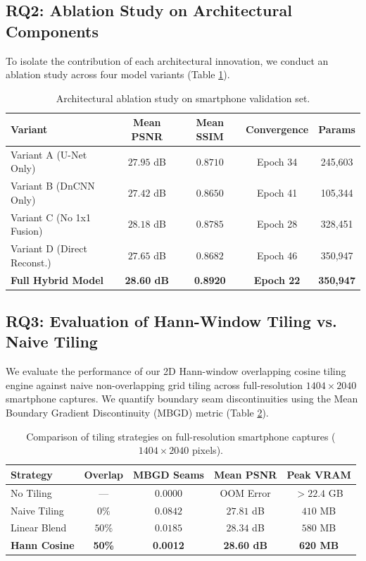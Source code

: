 \documentclass{ieeeaccess}
\begin{document}
\subsection{RQ2: Ablation Study on Architectural Components}
To isolate the contribution of each architectural innovation, we conduct an ablation study across four model variants (Table \ref{tab:ablation}).

\begin{table}[htbp]
\centering
\caption{Architectural ablation study on smartphone validation set.}
\label{tab:ablation}
\begin{tabular}{lcccc}
\toprule
Variant & Mean PSNR & Mean SSIM & Convergence & Params \\
\midrule
Variant A (U-Net Only) & $27.95$ dB & $0.8710$ & Epoch 34 & 245,603 \\
Variant B (DnCNN Only) & $27.42$ dB & $0.8650$ & Epoch 41 & 105,344 \\
Variant C (No 1x1 Fusion) & $28.18$ dB & $0.8785$ & Epoch 28 & 328,451 \\
Variant D (Direct Reconst.) & $27.65$ dB & $0.8682$ & Epoch 46 & 350,947 \\
\textbf{Full Hybrid Model} & \textbf{28.60 dB} & \textbf{0.8920} & \textbf{Epoch 22} & \textbf{350,947} \\
\bottomrule
\end{tabular}
\end{table}

\subsection{RQ3: Evaluation of Hann-Window Tiling vs. Naive Tiling}
We evaluate the performance of our 2D Hann-window overlapping cosine tiling engine against naive non-overlapping grid tiling across full-resolution $1404 \times 2040$ smartphone captures. We quantify boundary seam discontinuities using the Mean Boundary Gradient Discontinuity (MBGD) metric (Table \ref{tab:tiling}).

\begin{table}[htbp]
\centering
\caption{Comparison of tiling strategies on full-resolution smartphone captures ($1404 \times 2040$ pixels).}
\label{tab:tiling}
\begin{tabular}{lcccc}
\toprule
Strategy & Overlap & MBGD Seams & Mean PSNR & Peak VRAM \\
\midrule
No Tiling & --- & $0.0000$ & OOM Error & $>22.4$ GB \\
Naive Tiling & $0\%$ & $0.0842$ & $27.81$ dB & $410$ MB \\
Linear Blend & $50\%$ & $0.0185$ & $28.34$ dB & $580$ MB \\
\textbf{Hann Cosine} & \textbf{50\%} & \textbf{0.0012} & \textbf{28.60 dB} & \textbf{620 MB} \\
\bottomrule
\end{tabular}
\end{table}
\end{document}

